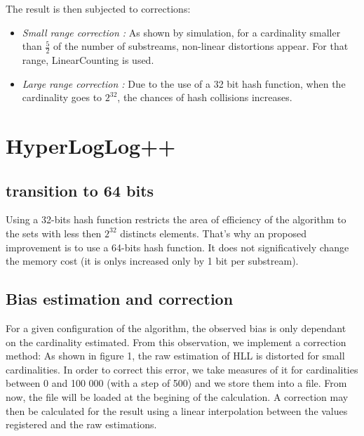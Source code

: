 \documentclass{article}
\begin{document}
The result is then subjected to corrections:
\begin{itemize}
\item \emph{Small range correction :} As shown by simulation, for a
  cardinality smaller than $\frac{5}{2}$ of the number of substreams, non-linear
  distortions appear. For that range, LinearCounting is used.
\item \emph{Large range correction :} Due to the use of a 32 bit hash
  function, when the cardinality goes to $2^{32}$, the chances of hash
  collisions increases.
\end{itemize}

\section{HyperLogLog++}

\subsection{transition to 64 bits}
Using a 32-bits hash function restricts the area of efficiency of the
algorithm to the sets with less then $2^{32}$ distincts elements.
That's why an proposed improvement is to use a 64-bits hash function.
It does not significatively change the memory cost (it is
 onlys increased only by 1 bit per substream).

\subsection{Bias estimation and correction}
For a given configuration of the algorithm, the observed bias is only
dependant on the cardinality estimated. From this observation, we
implement a correction method: As shown in figure 1, the raw
estimation of HLL is distorted for small cardinalities. In order to
correct this error, we take measures of it for cardinalities between 0
and 100 000 (with a step of 500) and we store them into a file. From
now, the file will be loaded at the begining of the calculation. A
correction may then be calculated for the result using a linear
interpolation between the values registered and the raw estimations.
\end{document}
